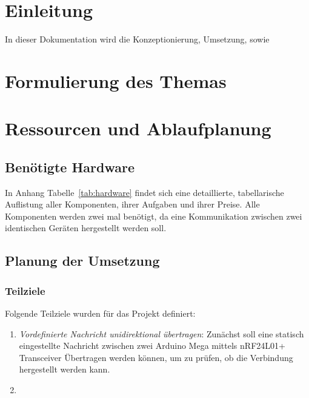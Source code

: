 \documentclass[a4paper, 11pt]{scrartcl}
\begin{document}
\newpage
\thispagestyle{empty}
\tableofcontents
\newpage
\clearpage
{}
\section{Einleitung}
In dieser Dokumentation wird die Konzeptionierung, Umsetzung, sowie 

\section{Formulierung des Themas}

\section{Ressourcen und Ablaufplanung}

\subsection{Benötigte Hardware}
In Anhang Tabelle~\ref{tab:hardware} findet sich eine detaillierte, tabellarische Auflistung aller Komponenten, ihrer Aufgaben und ihrer Preise.
Alle Komponenten werden zwei mal benötigt, da eine Kommunikation zwischen zwei identischen Geräten hergestellt werden soll.




\subsection{Planung der Umsetzung}


\subsubsection{Teilziele}
Folgende Teilziele wurden für das Projekt definiert:
\begin{enumerate}
    \item \textit{Vordefinierte Nachricht unidirektional übertragen}: Zunächst soll eine statisch eingestellte Nachricht zwischen zwei Arduino Mega mittels nRF24L01+ Transceiver
            Übertragen werden können, um zu prüfen, ob die Verbindung hergestellt werden kann.
    \item \textit{}
\end{enumerate}
\end{document}
